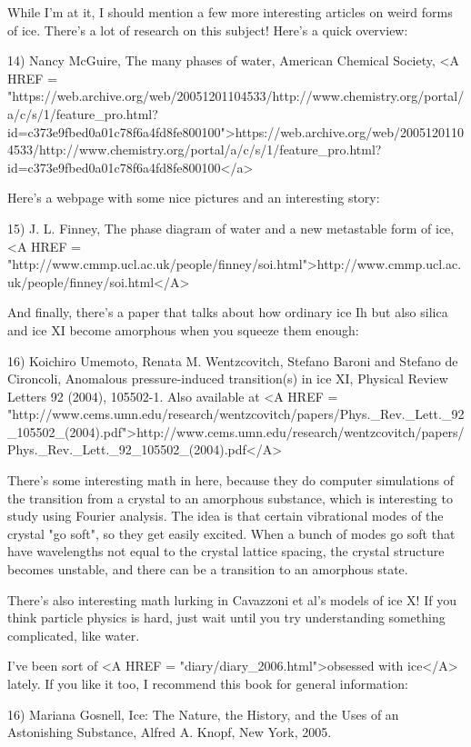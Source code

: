 While I'm at it, I should mention a few more interesting articles
on weird forms of ice.  There's a lot of research on this subject!
Here's a quick overview:

14) Nancy McGuire, The many phases of water, American Chemical Society, 
<A HREF = "https://web.archive.org/web/20051201104533/http://www.chemistry.org/portal/a/c/s/1/feature_pro.html?id=c373e9fbed0a01c78f6a4fd8fe800100">https://web.archive.org/web/20051201104533/http://www.chemistry.org/portal/a/c/s/1/feature_pro.html?id=c373e9fbed0a01c78f6a4fd8fe800100</a>

Here's a webpage with some nice pictures and an interesting story:

15) J. L. Finney, The phase diagram of water and a new metastable form of 
ice, <A HREF = "http://www.cmmp.ucl.ac.uk/people/finney/soi.html">http://www.cmmp.ucl.ac.uk/people/finney/soi.html</A>

And finally, there's a paper that talks about how ordinary 
ice Ih but also silica and ice XI become amorphous when you 
squeeze them enough:

16) Koichiro Umemoto, Renata M. Wentzcovitch, Stefano Baroni and Stefano
de Cironcoli, Anomalous pressure-induced transition(s) in ice XI, Physical
Review Letters 92 (2004), 105502-1.   Also available at
<A HREF = "http://www.cems.umn.edu/research/wentzcovitch/papers/Phys._Rev._Lett._92_105502_(2004).pdf">http://www.cems.umn.edu/research/wentzcovitch/papers/Phys._Rev._Lett._92_105502_(2004).pdf</A>

There's some interesting math in here, because they do computer
simulations of the transition from a crystal to an amorphous 
substance, which is interesting to study using Fourier analysis.  
The idea is that certain vibrational modes of the crystal 
"go soft", so they get easily excited.  When a bunch of modes 
go soft that have wavelengths not equal to the crystal lattice 
spacing, the crystal structure becomes unstable, and there can 
be a transition to an amorphous state.

There's also interesting math lurking in Cavazzoni et al's 
models of ice X!  If you think particle physics is hard, just
wait until you try understanding something complicated, like water.

I've been sort of <A HREF = "diary/diary_2006.html">obsessed with 
ice</A> lately.  If you like it too,
I recommend this book for general information:

16) Mariana Gosnell, Ice: The Nature, the History, and the Uses of
an Astonishing Substance, Alfred A. Knopf, New York, 2005.

